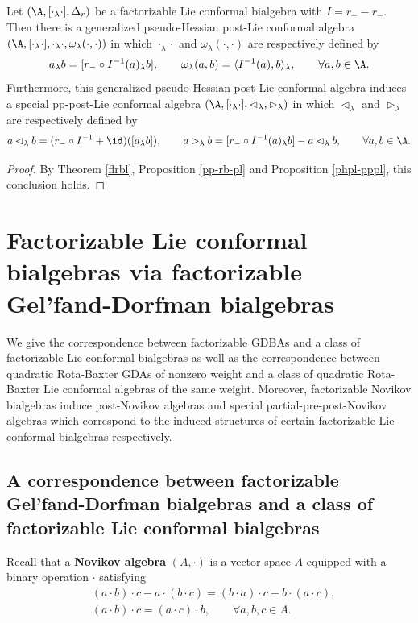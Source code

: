 \documentclass[12pt]{amsart}
\begin{document}
\begin{theorem}\label{th-ias}
Let $(\A,[\cdot_\lambda\cdot],\Delta_r)$ be a factorizable Lie
conformal bialgebra with $I=r_+-r_-$. Then
 there is a generalized pseudo-Hessian post-Lie conformal algebra
 $(\A,[\cdot_\lambda\cdot],\cdot_\lambda\cdot,\omega_{\lambda}(\cdot,\cdot))$
 in which $\cdot_\lambda\cdot$ and $\omega_{\lambda}(\cdot,\cdot)$
 are respectively defined by
    \begin{align*}
        a_\lambda b=[r_-\circ I^{-1}(a)_\lambda b],\qquad \omega_\lambda (a,b)=\langle I^{-1}(a),b\rangle_\lambda, \qquad\forall a,b\in \A.
    \end{align*}
Furthermore, this generalized pseudo-Hessian post-Lie conformal
algebra induces a special pp-post-Lie conformal algebra
    $(\A,[\cdot_\lambda\cdot],\lhd_\lambda,\rhd_\lambda)$ in which
    $\lhd_\lambda$ and $\rhd_\lambda$ are respectively
    defined by
    $$
    a   \lhd_\lambda b=(r_-\circ I^{-1}+ \id)([a_\lambda b]),\qquad a\rhd_\lambda b=[r_-\circ I^{-1}(a)_\lambda b]-a    \lhd_\lambda b,\qquad\forall a,b\in \A.
    $$

\end{theorem}
\begin{proof}
    By Theorem \ref{flrbl}, Proposition \ref{pp-rb-pl} and Proposition \ref{phpl-pppl}, this conclusion holds.
\end{proof}


\section{Factorizable Lie conformal bialgebras via factorizable Gel'fand-Dorfman bialgebras}\label{4}

We give the correspondence between factorizable GDBAs and a  class
of factorizable Lie conformal bialgebras as well as the
correspondence between  quadratic   Rota-Baxter GDAs of nonzero
weight and a class of  quadratic   Rota-Baxter Lie conformal
algebras of the same weight. Moreover, factorizable Novikov
bialgebras induce post-Novikov algebras and special
partial-pre-post-Novikov algebras which correspond to the induced
structures of certain factorizable Lie conformal bialgebras
respectively.



\subsection{A correspondence between factorizable Gel'fand-Dorfman bialgebras and a class of factorizable Lie conformal bialgebras}
Recall that a {\bf Novikov algebra} $(A,\cdot)$ is a vector space $A$ equipped with a binary operation $\cdot$ satisfying
\begin{align}
  \label{na1}  &(a\cdot b)\cdot c-a\cdot(b\cdot c)=(b\cdot a)\cdot c-b\cdot(a\cdot c),\\
    \label{na2}&(a\cdot b)\cdot c=(a\cdot c)\cdot b,\qquad    \forall a,b,c\in A.
\end{align}
\end{document}
